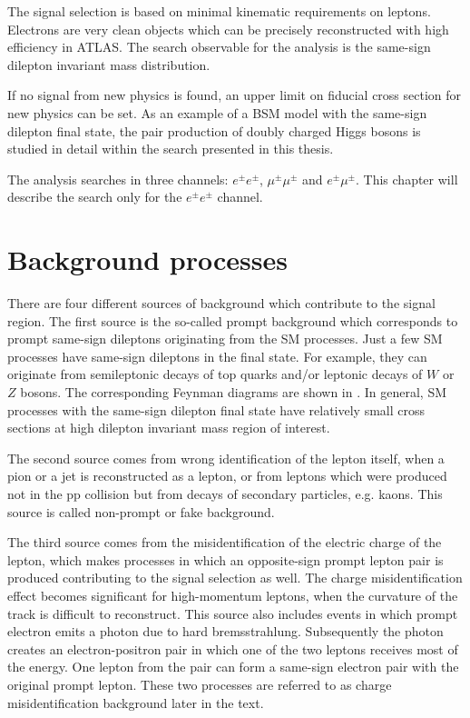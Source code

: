 The signal selection is based on minimal kinematic requirements on leptons.
Electrons are very clean objects which can be precisely reconstructed with high efficiency in ATLAS.
The search observable for the analysis is the same-sign dilepton invariant mass distribution.

If no signal from new physics is found, an upper limit on fiducial cross section for new physics can be set.
As an example of a BSM model with the same-sign dilepton final state, the pair production of doubly charged Higgs bosons is studied in detail within the search presented in this thesis.

The analysis searches in three channels: $e^{\pm}e^{\pm}$, $\mu^{\pm}\mu^{\pm}$ and $e^{\pm}\mu^{\pm}$.
This chapter will describe the search only for the $e^{\pm}e^{\pm}$ channel.

\section{Background processes}
\label{sec:wprimeBackgrounds}

There are four different sources of background which contribute to the signal region.
The first source is the so-called prompt background which corresponds to prompt same-sign dileptons originating from the SM processes.
Just a few SM processes have same-sign dileptons in the final state. 
For example, they can originate from semileptonic decays of top quarks
and/or leptonic decays of $W$ or $Z$ bosons. The corresponding Feynman diagrams are shown in .
In general, SM processes with the same-sign dilepton final state have relatively small cross sections at high dilepton invariant mass region of interest.

The second source comes from wrong identification of the lepton itself, when a pion or a jet is reconstructed as a lepton, or from leptons which were produced 
not in the pp collision but from decays of secondary particles, e.g. kaons. This source is called non-prompt or fake background.

The third source comes from the misidentification of the electric charge of the lepton, which makes processes in which an opposite-sign prompt lepton pair is produced 
contributing to the signal selection as well. The charge misidentification effect becomes significant for high-momentum leptons, when the curvature of the track 
is difficult to reconstruct. 
This source also includes events in which prompt electron emits a photon due to hard bremsstrahlung. Subsequently the photon creates an electron-positron pair in which one of the two leptons receives most of the energy.
One lepton from the pair can form a same-sign electron pair with the original prompt lepton. These two processes are referred to as charge misidentification 
background later in the text.

